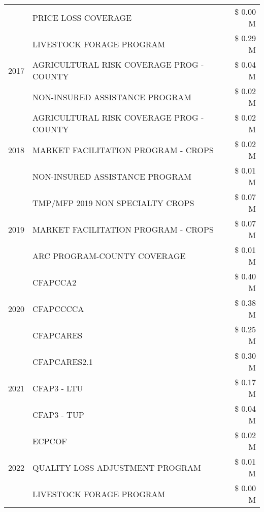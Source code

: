 \begin{tabular}{llr}
 & PRICE LOSS COVERAGE & \$ 0.00 M \\
\cline{1-3}
\multirow[t]{3}{*}{2017} & LIVESTOCK FORAGE PROGRAM & \$ 0.29 M \\
 & AGRICULTURAL RISK COVERAGE PROG - COUNTY & \$ 0.04 M \\
 & NON-INSURED ASSISTANCE PROGRAM & \$ 0.02 M \\
\cline{1-3}
\multirow[t]{3}{*}{2018} & AGRICULTURAL RISK COVERAGE PROG - COUNTY & \$ 0.02 M \\
 & MARKET FACILITATION PROGRAM - CROPS & \$ 0.02 M \\
 & NON-INSURED ASSISTANCE PROGRAM & \$ 0.01 M \\
\cline{1-3}
\multirow[t]{3}{*}{2019} & TMP/MFP 2019 NON SPECIALTY CROPS & \$ 0.07 M \\
 & MARKET FACILITATION PROGRAM - CROPS & \$ 0.07 M \\
 & ARC PROGRAM-COUNTY COVERAGE & \$ 0.01 M \\
\cline{1-3}
\multirow[t]{3}{*}{2020} & CFAPCCA2 & \$ 0.40 M \\
 & CFAPCCCCA & \$ 0.38 M \\
 & CFAPCARES & \$ 0.25 M \\
\cline{1-3}
\multirow[t]{3}{*}{2021} & CFAPCARES2.1 & \$ 0.30 M \\
 & CFAP3 - LTU & \$ 0.17 M \\
 & CFAP3 - TUP & \$ 0.04 M \\
\cline{1-3}
\multirow[t]{3}{*}{2022} & ECPCOF & \$ 0.02 M \\
 & QUALITY LOSS ADJUSTMENT PROGRAM & \$ 0.01 M \\
 & LIVESTOCK FORAGE PROGRAM & \$ 0.00 M \\
\cline{1-3}
\bottomrule
\end{tabular}
